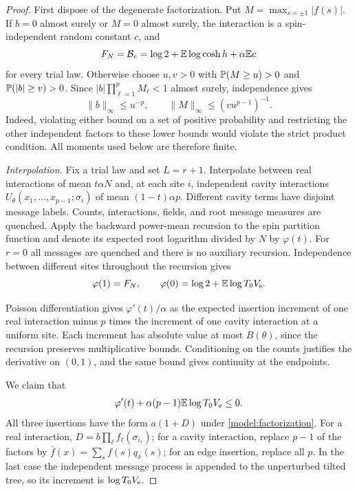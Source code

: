 \begin{proof}
First dispose of the degenerate factorization. Put
$M=\max_{s=\pm1}|f(s)|$. If $b=0$ almost surely or $M=0$ almost surely,
the interaction is a spin-independent random constant $c$, and
\[
 F_N=\cB_r=\log2+\E\log\cosh h+\alpha\E c
\]
for every trial law. Otherwise choose $u,v>0$ with
$\P(M\ge u)>0$ and $\P(|b|\ge v)>0$. Since
$|b|\prod_{\ell=1}^p M_\ell<1$ almost surely, independence gives
\[
 \|b\|_\infty\le u^{-p},\qquad
 \|M\|_\infty\le(vu^{p-1})^{-1}.
\]
Indeed, violating either bound on a set of positive probability and
restricting the other independent factors to these lower bounds would
violate the strict product condition. All moments used below are
therefore finite.

\emph{Interpolation.}
Fix a trial law and set $L=r+1$. Interpolate between real interactions of mean $t\alpha N$
and, at each site $i$, independent cavity interactions
$U_\theta(x_1,\ldots,x_{p-1};\sigma_i)$ of mean $(1-t)\alpha p$.
Different cavity terms have disjoint message labels. Counts, interactions,
fields, and root message measures are quenched. Apply the backward
power-mean recursion to the spin partition function and denote its expected
root logarithm divided by $N$ by $\varphi(t)$. For $r=0$ all messages are
quenched and there is no auxiliary recursion. Independence between different
sites throughout the recursion gives
\[
 \varphi(1)=F_N,\qquad
 \varphi(0)=\log2+\E\log T_0V_{\rm s}.
\]

Poisson differentiation gives $\varphi'(t)/\alpha$ as the expected insertion
increment of one real interaction minus $p$ times the increment of one
cavity interaction at a uniform site. Each increment has absolute value at
most $B(\theta)$, since the recursion preserves multiplicative bounds.
Conditioning on the counts justifies the derivative on $(0,1)$, and the same
bound gives continuity at the endpoints.

We claim that
\begin{equation}\label{upper:derivative}
 \varphi'(t)+\alpha(p-1)\E\log T_0V_{\rm e}\le0.
\end{equation}
All three insertions have the form $a(1+D)$ under
\eqref{model:factorization}. For a real interaction,
$D=b\prod_\ell f_\ell(\sigma_{i_\ell})$; for a cavity interaction, replace
$p-1$ of the factors by
$\bar f(x)=\sum_s f(s)q_x(s)$; for an edge insertion, replace all $p$.
In the last case the independent message process is appended to the
unperturbed tilted tree, so its increment is $\log T_0V_{\rm e}$.


\end{proof}
